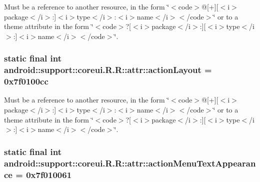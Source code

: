Must be a reference to another resource, in the form \char`\"{}$<$code$>$@\mbox{[}+\mbox{]}\mbox{[}$<$i$>$package$<$/i$>$:\mbox{]}$<$i$>$type$<$/i$>$:$<$i$>$name$<$/i$>$$<$/code$>$\char`\"{} or to a theme attribute in the form \char`\"{}$<$code$>$?\mbox{[}$<$i$>$package$<$/i$>$:\mbox{]}\mbox{[}$<$i$>$type$<$/i$>$:\mbox{]}$<$i$>$name$<$/i$>$$<$/code$>$\char`\"{}. \hypertarget{classandroid_1_1support_1_1coreui_1_1_r_1_1attr_c14ef8d7b1f70de4805e20cc77ff64fb}{
\subsubsection[{actionLayout}]{\setlength{\rightskip}{0pt plus 5cm}static final int android::support::coreui.R.R::attr::actionLayout = 0x7f0100cc}}
\label{classandroid_1_1support_1_1coreui_1_1_r_1_1attr_c14ef8d7b1f70de4805e20cc77ff64fb}


Must be a reference to another resource, in the form \char`\"{}$<$code$>$@\mbox{[}+\mbox{]}\mbox{[}$<$i$>$package$<$/i$>$:\mbox{]}$<$i$>$type$<$/i$>$:$<$i$>$name$<$/i$>$$<$/code$>$\char`\"{} or to a theme attribute in the form \char`\"{}$<$code$>$?\mbox{[}$<$i$>$package$<$/i$>$:\mbox{]}\mbox{[}$<$i$>$type$<$/i$>$:\mbox{]}$<$i$>$name$<$/i$>$$<$/code$>$\char`\"{}. \hypertarget{classandroid_1_1support_1_1coreui_1_1_r_1_1attr_57f13febbb6e9dea19f743a924c1dd45}{
\subsubsection[{actionMenuTextAppearance}]{\setlength{\rightskip}{0pt plus 5cm}static final int android::support::coreui.R.R::attr::actionMenuTextAppearance = 0x7f010061}}
\label{classandroid_1_1support_1_1coreui_1_1_r_1_1attr_57f13febbb6e9dea19f743a924c1dd45}


